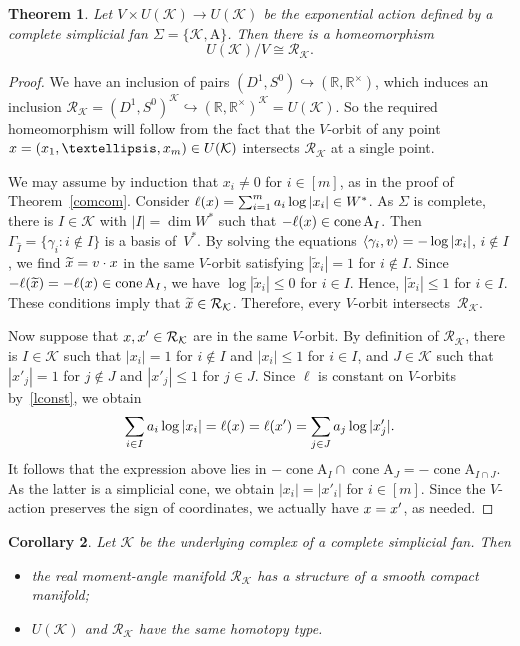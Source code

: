 \documentclass[a4paper]{amsart}
\newtheorem{theorem}{Theorem}[section]
\newtheorem{corollary}[theorem]{Corollary}
\theoremstyle{definition}
\theoremstyle{remark}
\numberwithin{equation}{section}
\def\R{\mathbb R}
\def\R{\mathbb R}
\def\sK{\mathcal K}
\newcommand{\mb}[1]{{\textbf {\textit#1}}}
\renewcommand{\le}{\leqslant}
\def\cone{\mathop{\mathrm{cone}}}
\def\rk{\mathcal R_{\mathcal K}}
\newcommand{\<}{\langle}
\renewcommand{\>}{\rangle}
\begin{document}
\begin{theorem}\label{quotrk}
Let $V\times U(\sK)\to U(\sK)$ be the exponential action defined by a complete simplicial fan $\Sigma=\{\sK,\mathrm A\}$. Then there is a homeomorphism 
\[
  U(\sK)/V\cong\rk.
\]
\end{theorem}
\begin{proof}
We have an inclusion of pairs $(D^1,S^0)\hookrightarrow(\R,\R^\times)$, which induces an inclusion 
$\rk=(D^1,S^0)^\sK\hookrightarrow(\R,\R^\times)^\sK=U(\sK)$. So the required homeomorphism will follow from the fact that the $V$-orbit of any point $\mb x=(x_1,\ldots,x_m)\in U(\sK)$ intersects $\rk$ at a single point. 

We may assume by induction that $x_i\ne0$ for $i\in[m]$, as in the proof of Theorem~\ref{comcom}. Consider $\ell(\mb x)=\sum_{i=1}^m\mb a_i\log|x_i|\in W^*$. As $\Sigma$ is complete, there is $I\in\sK$ with $|I|=\dim W^*$ such that $-\ell(\mb x)\in\cone\mathrm A_I$. Then $\Gamma_{\widehat I}=\{\gamma_i\colon i\notin I\}$ is a basis of~$V^*$. By solving the equations $\langle \gamma_i ,\mb v\rangle = -\log|x_i|$, $i \notin I$, we find $\widetilde{\mb x}=\mb v\cdot\mb x$ in the same $V$-orbit satisfying $|\widetilde x_i|=1$ for $i\notin I$. Since $-\ell(\widetilde{\mb x})=-\ell(\mb x)\in\cone\mathrm A_I$, we have $\log|\widetilde x_i|\le0$ for $i\in I$. Hence, $|\widetilde x_i|\le1$ for $i\in I$. These conditions imply that $\widetilde{\mb x}\in\rk$. Therefore, every $V$-orbit intersects~$\rk$.

Now suppose that $\mb x,\mb x'\in\rk$ are in the same $V$-orbit. By definition of $\rk$, there is $I\in\sK$ such that $|x_i|=1$ for $i\notin I$ and $|x_i|\le1$ for $i\in I$, and $J\in\sK$ such that 
$|x'_j|=1$ for $j\notin J$ and $|x'_j|\le1$ for $j\in J$. Since $\ell$ is constant on $V$-orbits by~\eqref{lconst}, we obtain
\[
  \sum_{i\in I}\mb a_i\log|x_i|=\ell(\mb x)=\ell(\mb x')=\sum_{j\in J}\mb a_j\log|x'_j|. 
\]
It follows that the expression above lies in $-\cone\mathrm A_I\cap\cone\mathrm A_J=-\cone\mathrm A_{I\cap J}$. As the latter is a simplicial cone, we obtain $|x_i|=|x'_i|$ for $i\in[m]$. Since the $V$-action preserves the sign of coordinates, we actually have $\mb x=\mb x'$, as needed.
\end{proof}

\begin{corollary}
Let $\sK$ be the underlying complex of a complete simplicial fan. Then
\begin{itemize}
\item[(1)] the real moment-angle manifold $\rk$ has a structure of a smooth compact manifold;
\item[(2)] $U(\sK)$ and $\rk$ have the same homotopy type.
\end{itemize}
\end{corollary}
\end{document}

